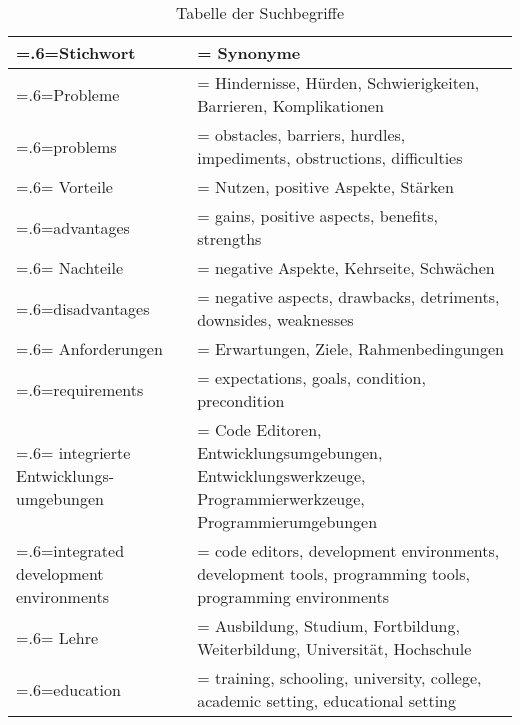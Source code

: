 \begin{table}[htbp]
    \centering
    \begin{tabularx}{\textwidth}{| >{\hsize=.6\hsize\linewidth=\hsize}X |
            >{\hsize=1.4\hsize\linewidth=\hsize}X |}
        \hline
        Stichwort                           & Synonyme                                                                                                  \\
        \hline
        Probleme                            & Hindernisse, Hürden, Schwierigkeiten, Barrieren, Komplikationen                                           \\ problems                            & obstacles, barriers, hurdles, impediments, obstructions, difficulties \\
        \hline
        Vorteile                            & Nutzen, positive Aspekte, Stärken                                                                         \\ advantages                          & gains, positive aspects, benefits, strengths \\
        \hline
        Nachteile                           & negative Aspekte, Kehrseite, Schwächen                                                                    \\ disadvantages                       & negative aspects, drawbacks, detriments, downsides, weaknesses \\
        \hline
        Anforderungen                       & Erwartungen, Ziele, Rahmenbedingungen                                                                     \\ requirements                        & expectations, goals, condition, precondition \\
        \hline
        integrierte Entwicklungs-umgebungen & Code Editoren, Entwicklungsumgebungen, Entwicklungswerkzeuge, Programmierwerkzeuge, Programmierumgebungen \\ integrated development environments & code editors, development environments, development tools, programming tools, programming environments \\
        \hline
        Lehre                               & Ausbildung, Studium, Fortbildung, Weiterbildung, Universität, Hochschule                                  \\ education                           & training, schooling, university, college, academic setting, educational setting  \\
        \hline
    \end{tabularx}
    \caption{Tabelle der Suchbegriffe}
    \label{table:search-terms}
\end{table}


